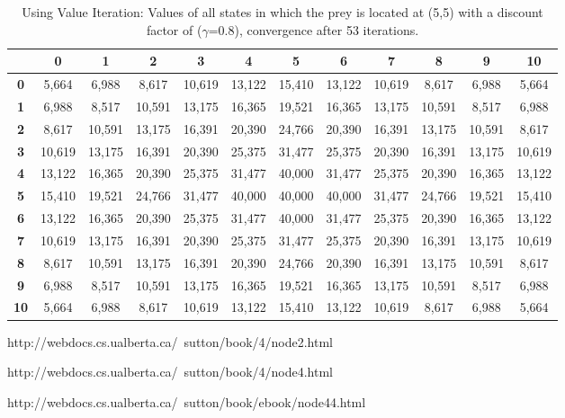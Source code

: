 \documentclass[11pt]{article}
\begin{document}
\begin{center}
\begin{table*}[ht]
{\small
\hfill{}
\begin{tabular}{c|c|c|c|c|c|c|c|c|c|c|c}
\textbf{} & \textbf{0} & \textbf{1} & \textbf{2} & \textbf{3} & \textbf{4} & \textbf{5} & \textbf{6} & \textbf{7} & \textbf{8} & \textbf{9} & \textbf{10}\\
	\hline
\textbf{0} & 5,664 & 6,988 & 8,617 & 10,619 & 13,122 & 15,410 & 13,122 & 10,619 & 8,617 & 6,988 & 5,664\\
\textbf{1} & 6,988 & 8,517 & 10,591 & 13,175 & 16,365 & 19,521 & 16,365 & 13,175 & 10,591 & 8,517 & 6,988\\
\textbf{2} & 8,617 & 10,591 & 13,175 & 16,391 & 20,390 & 24,766 & 20,390 & 16,391 & 13,175 & 10,591 & 8,617\\
\textbf{3} & 10,619 & 13,175 & 16,391 & 20,390 & 25,375 & 31,477 & 25,375 & 20,390 & 16,391 & 13,175 & 10,619\\
\textbf{4} & 13,122 & 16,365 & 20,390 & 25,375 & 31,477 & 40,000 & 31,477 & 25,375 & 20,390 & 16,365 & 13,122\\
\textbf{5} & 15,410 & 19,521 & 24,766 & 31,477 & 40,000 & 40,000 & 40,000 & 31,477 & 24,766 & 19,521 & 15,410\\
\textbf{6} & 13,122 & 16,365 & 20,390 & 25,375 & 31,477 & 40,000 & 31,477 & 25,375 & 20,390 & 16,365 & 13,122\\
\textbf{7} & 10,619 & 13,175 & 16,391 & 20,390 & 25,375 & 31,477 & 25,375 & 20,390 & 16,391 & 13,175 & 10,619\\
\textbf{8} & 8,617 & 10,591 & 13,175 & 16,391 & 20,390 & 24,766 & 20,390 & 16,391 & 13,175 & 10,591 & 8,617\\
\textbf{9} & 6,988 & 8,517 & 10,591 & 13,175 & 16,365 & 19,521 & 16,365 & 13,175 & 10,591 & 8,517 & 6,988\\
\textbf{10} & 5,664 & 6,988 & 8,617 & 10,619 & 13,122 & 15,410 & 13,122 & 10,619 & 8,617 & 6,988 & 5,664\\
\end{tabular}}
\hfill{}
\caption{Using Value Iteration: Values of all states in which the prey is located at (5,5) with a discount factor of ($\gamma$=0.8), convergence after 53 iterations.}
\label{table:gamma=0.8}
\end{table*}
\end{center}



\begin{thebibliography}{3}

 http://webdocs.cs.ualberta.ca/~sutton/book/4/node2.html

 http://webdocs.cs.ualberta.ca/~sutton/book/4/node4.html

 http://webdocs.cs.ualberta.ca/~sutton/book/ebook/node44.html


\end{thebibliography}
\end{document}
